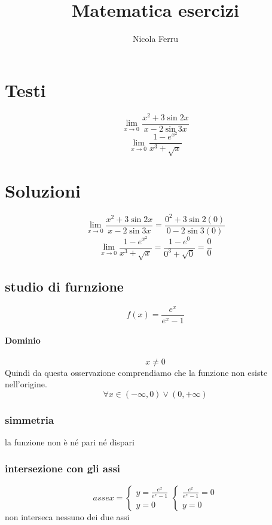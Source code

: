 \documentclass{article}
\title{Matematica esercizi}
\author{Nicola Ferru}
\date{}
\begin{document}
\maketitle
	\chapter{Testi}
	\begin{equation*}
          \lim_{x\to 0}\frac{x^2+3\sin2x}{x-2\sin3x}
    \end{equation*}
	\begin{equation}
		\lim_{x\to 0} \frac{1-e^{x^2}}{x^3+\sqrt{x}}
	\end{equation}
	\chapter{Soluzioni}
	\begin{equation*}
          \lim_{x\to 0}\frac{x^2+3\sin2x}{x-2\sin3x}=\frac{0^2+3\sin2(0)}{0-2\sin3(0)}
	\end{equation*}
	\begin{equation*}
		\lim_{x\to 0}\frac{1-e^{x^2}}{x^3+\sqrt{x}}=\frac{1-e^0}{0^3+\sqrt{0}}=\frac{0}{0}
	\end{equation*}
	\section{studio di furnzione}
	\begin{equation*}
		f(x)=\frac{e^x}{e^x-1}
	\end{equation*}
	\subsubsection{Dominio}
	\begin{equation*}
		x\neq 0
	\end{equation*}
	Quindi da questa osservazione comprendiamo che la funzione non esiste
	nell'origine.
	\begin{equation*}
		\forall x \in \left(-\infty, 0\right) \vee \left(0, +\infty\right)
	\end {equation*}
	\subsection{simmetria}
		la funzione non è né pari né dispari
	\subsection{intersezione con gli assi}
	\begin{equation*}
		asse x =\begin{cases}
			y=\frac{e^x}{e^x-1}\\
			y=0
		\end{cases}\begin{cases}
			\frac{e^x}{e^x-1}=0\\
			y=0
		\end{cases}
	\end{equation*}
	non interseca nessuno dei due assi
\end{document}
